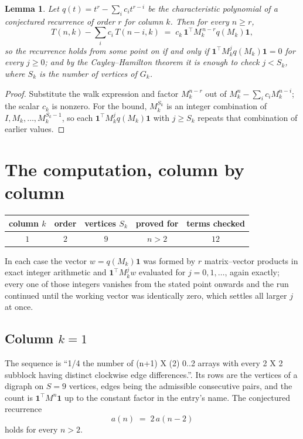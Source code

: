 \documentclass[11pt,a4paper]{article}
\theoremstyle{plain}
\newtheorem{lemma}[theorem]{Lemma}
\theoremstyle{definition}
\begin{document}
\begin{lemma}\label{lem:crit}
Let $q(t)=t^{r}-\sum_i c_it^{r-i}$ be the characteristic polynomial of a conjectured
recurrence of order $r$ for column $k$. Then for every $n\ge r$,
\[
T(n,k)-\sum_i c_i\,T(n-i,k)\;=\;c_k\,\mathbf{1}^{\!\top}M_k^{\,n-r}q(M_k)\mathbf{1},
\]
so the recurrence holds from some point on if and only if
$\mathbf{1}^{\!\top}M_k^{j}q(M_k)\mathbf{1}=0$ for every $j\ge0$; and by the
Cayley--Hamilton theorem it is enough to check $j<S_k$, where $S_k$ is the number of vertices
of $G_k$.
\end{lemma}

\begin{proof}
Substitute the walk expression and factor $M_k^{n-r}$ out of $M_k^{n}-\sum_ic_iM_k^{n-i}$;
the scalar $c_k$ is nonzero. For the bound, $M_k^{S_k}$ is an integer combination of
$I,M_k,\dots,M_k^{S_k-1}$, so each $\mathbf{1}^{\!\top}M_k^{j}q(M_k)\mathbf{1}$ with
$j\ge S_k$ repeats that combination of earlier values.
\end{proof}

\section{The computation, column by column}

\begin{center}
\begin{tabular}{ccccc}
column $k$ & order & vertices $S_k$ & proved for & terms checked \\ \hline
$1$ & $2$ & $9$ & $n>2$ & $12$ \\
\end{tabular}
\end{center}

In each case the vector $w=q(M_k)\mathbf{1}$ was formed by $r$ matrix--vector products in
exact integer arithmetic and $\mathbf{1}^{\!\top}M_k^{j}w$ evaluated for $j=0,1,\dots$,
again exactly; every one of those integers vanishes from the stated point onwards and the run
continued until the working vector was identically zero, which settles all larger $j$ at once.

\subsection*{Column $k=1$}
The sequence is ``1/4 the number of (n+1) X (2) 0..2 arrays with every 2 X 2 subblock having distinct clockwise edge differences.''. Its rows are the vertices of a digraph on
$S=9$ vertices, edges being the admissible consecutive pairs, and the count is
$\mathbf{1}^{\!\top}M^{n}\mathbf{1}$ up to the constant factor in the entry's name.
The conjectured recurrence
\[
a(n)\;=\;2\,a(n-2)
\]
holds for every $n>2$.
\end{document}
